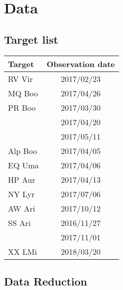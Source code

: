 \chapter{Data}

\section{Target list}
\begin{center}
\begin{tabular}{l c}
    \toprule
    Target  &   Observation date \\ \bottomrule
    RV Vir  & 2017/02/23 \\ \midrule
    MQ Boo  & 2017/04/26 \\ \midrule
    PR Boo  & 2017/03/30 \\ \midrule
            & 2017/04/20 \\ \midrule
            & 2017/05/11 \\ \midrule
    Alp Boo & 2017/04/05 \\ \midrule
    EQ Uma  & 2017/04/06 \\ \midrule
    HP Aur  & 2017/04/13 \\ \midrule
    NY Lyr  & 2017/07/06 \\ \midrule
    AW Ari  & 2017/10/12 \\ \midrule
    SS Ari  & 2016/11/27 \\ \midrule
            & 2017/11/01 \\ \midrule
    XX LMi  & 2018/03/20 \\
    \bottomrule
\end{tabular}
\end{center}

\section{Data Reduction}

